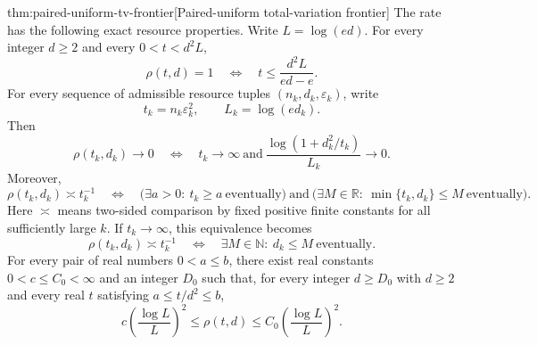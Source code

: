 \documentclass[11pt]{article}
\begin{document}
\begin{theoremv}{thm:paired-uniform-tv-frontier}[Paired-uniform total-variation frontier]
The rate has the following exact resource properties. Write \(L=\log(ed)\). For every integer \(d\ge2\) and every \(0<t<d^2L\),
\[
 \rho(t,d)=1
 \quad\Longleftrightarrow\quad
 t\le\frac{d^2L}{ed-e}.
\]
For every sequence of admissible resource tuples
\((n_k,d_k,\varepsilon_k)\), write
\[
 t_k=n_k\varepsilon_k^2,\qquad L_k=\log(ed_k).
\]
Then
\[
 \rho(t_k,d_k)\longrightarrow0
 \quad\Longleftrightarrow\quad
 t_k\longrightarrow\infty
 \ \text{and}\
 \frac{\log(1+d_k^2/t_k)}{L_k}\longrightarrow0.
\]
Moreover,
\[
 \rho(t_k,d_k)\asymp t_k^{-1}
 \quad\Longleftrightarrow\quad
 \bigl(\exists a>0:\ t_k\ge a\ \text{eventually}\bigr)
 \ \text{and}\
 \bigl(\exists M\in\mathbb R:\ \min\{t_k,d_k\}\le M\
       \text{eventually}\bigr).
\]
Here \(\asymp\) means two-sided comparison by fixed positive finite constants for all sufficiently large \(k\). If \(t_k\to\infty\), this equivalence becomes
\[
 \rho(t_k,d_k)\asymp t_k^{-1}
 \quad\Longleftrightarrow\quad
 \exists M\in\mathbb N:\ d_k\le M\ \text{eventually}.
\]
For every pair of real numbers \(0<a\le b\), there exist real constants \(0<c\le C_0<\infty\) and an integer \(D_0\) such that, for every integer \(d\ge D_0\) with \(d\ge2\) and every real \(t\) satisfying \(a\le t/d^2\le b\),
\[
 c\left(\frac{\log L}{L}\right)^2
 \le \rho(t,d)
 \le C_0\left(\frac{\log L}{L}\right)^2.
\]


\end{theoremv}
\end{document}
